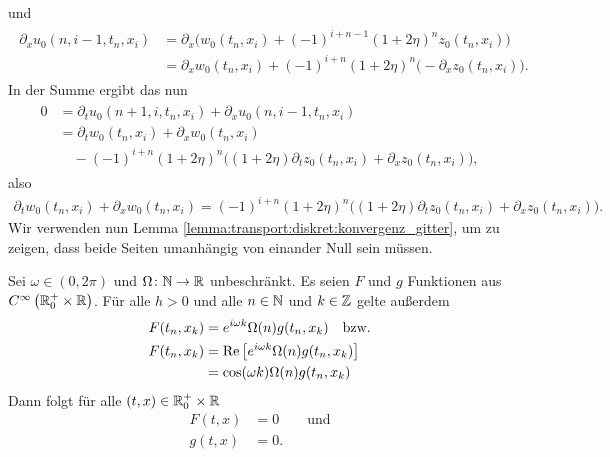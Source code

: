 und
\begin{align}
\begin{split}
\partial_x u_0(n, i-1, t_n, x_i) &= \partial_x \bigl( w_0(t_n, x_i) + (-1)^{i+n-1} (1 + 2\eta)^n z_0(t_n, x_i) \bigr)\\
&= \partial_x w_0(t_n, x_i) + (-1)^{i+n} (1 + 2\eta)^n \bigl( - \partial_x z_0(t_n, x_i) \bigr).
\end{split}
\end{align}
In der Summe ergibt das nun
\begin{align}\label{alt:summe1}
\begin{split}
0 &= \partial_t u_0(n+1, i, t_n, x_i) + \partial_x u_0(n, i-1, t_n, x_i)\\
&= \partial_t w_0(t_n, x_i) + \partial_x w_0(t_n, x_i)\\
&\quad - (-1)^{i+n} (1 + 2\eta)^n \bigl( (1 + 2 \eta) \partial_t z_0(t_n, x_i) + \partial_x z_0(t_n, x_i) \bigr),
\end{split}
\end{align}
also
\begin{align}\label{eq:apx:beidenull1}
\partial_t w_0(t_n, x_i) + \partial_x w_0(t_n, x_i) = (-1)^{i+n} (1 + 2\eta)^n \bigl( (1 + 2 \eta) \partial_t z_0(t_n, x_i) + \partial_x z_0(t_n, x_i) \bigr).
\end{align}
Wir verwenden nun Lemma \ref{lemma:transport:diskret:konvergenz_gitter}, um zu zeigen, dass beide Seiten umanhängig von einander Null sein müssen.
\begin{satz}\label{satz:alt:beidenull}
Sei $\omega \in (0, 2 \pi)$ und $\Omega\colon \mathbb N \to \mathbb R$ unbeschränkt. 
Es seien $F$ und $g$ Funktionen aus $C^{\infty}\left( \mathbb R^+_0 \times \mathbb R \right)$. Für alle $h > 0$ und alle $n \in \mathbb N$ und $k \in \mathbb Z$ gelte außerdem
\begin{align}\label{eq:apx:beidenull}
\begin{split}
F(t_n,x_k) &= e^{i \omega k} \Omega(n) g(t_n,x_k) \quad \text{bzw.}\\
F(t_n,x_k) &= \operatorname{Re} \left[ e^{i \omega k} \Omega(n) g(t_n,x_k) \right]\\
           &= \cos(\omega k) \Omega(n) g(t_n, x_k)
\end{split}
\end{align}
Dann folgt für alle $(t,x) \in \mathbb R^+_0 \times \mathbb R$
\begin{align*}
F(t,x) &= 0 \qquad \text{und}\\ 
g(t,x) &= 0. 
\end{align*} 
\end{satz}
